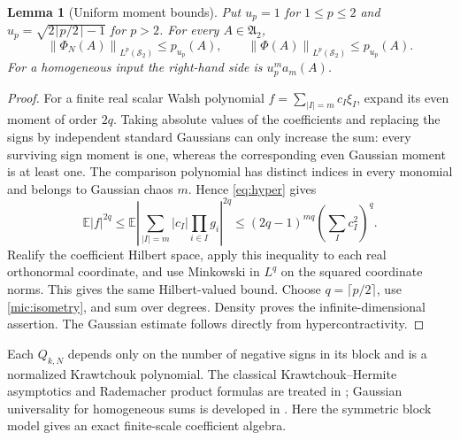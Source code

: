 \documentclass[11pt,a4paper]{amsart}
\numberwithin{equation}{section}
\newtheorem{lemma}[theorem]{Lemma}
\theoremstyle{definition}
\theoremstyle{remark}
\newcommand{\E}{\mathbb E}
\newcommand{\Sch}{\mathcal S}
\newcommand{\Alg}{\mathfrak A}
\newcommand{\norm}[1]{\left\lVert#1\right\rVert}
\begin{document}
\begin{lemma}[Uniform moment bounds]\label{mic:moments}
Put $u_p=1$ for $1\le p\le2$ and $u_p=\sqrt{2\lceil p/2\rceil-1}$ for $p>2$. For every $A\in\Alg_2$,
\begin{equation}\label{mic:moment_bound}
 \norm{\Phi_N(A)}_{L^p(\Sch_2)}\le p_{u_p}(A),\qquad
 \norm{\Phi(A)}_{L^p(\Sch_2)}\le p_{u_p}(A).
\end{equation}
For a homogeneous input the right-hand side is $u_p^m a_m(A)$.
\end{lemma}
\begin{proof}
For a finite real scalar Walsh polynomial $f=\sum_{|I|=m}c_I\xi_I$, expand its even moment of order $2q$. Taking absolute values of the coefficients and replacing the signs by independent standard Gaussians can only increase the sum: every surviving sign moment is one, whereas the corresponding even Gaussian moment is at least one. The comparison polynomial has distinct indices in every monomial and belongs to Gaussian chaos $m$. Hence \eqref{eq:hyper} gives
\[
 \E|f|^{2q}\le
 \E\left|\sum_{|I|=m}|c_I|\prod_{i\in I}g_i\right|^{2q}
 \le(2q-1)^{mq}\left(\sum_Ic_I^2\right)^q.
\]
Realify the coefficient Hilbert space, apply this inequality to each real orthonormal coordinate, and use Minkowski in $L^q$ on the squared coordinate norms. This gives the same Hilbert-valued bound. Choose $q=\lceil p/2\rceil$, use \eqref{mic:isometry}, and sum over degrees. Density proves the infinite-dimensional assertion. The Gaussian estimate follows directly from hypercontractivity.
\end{proof}

Each $Q_{k,N}$ depends only on the number of negative signs in its block and is a normalized Krawtchouk polynomial. The classical Krawtchouk--Hermite asymptotics and Rademacher product formulas are treated in \cite{Min,NPRR}; Gaussian universality for homogeneous sums is developed in \cite{NPR}. Here the symmetric block model gives an exact finite-scale coefficient algebra.
\end{document}
